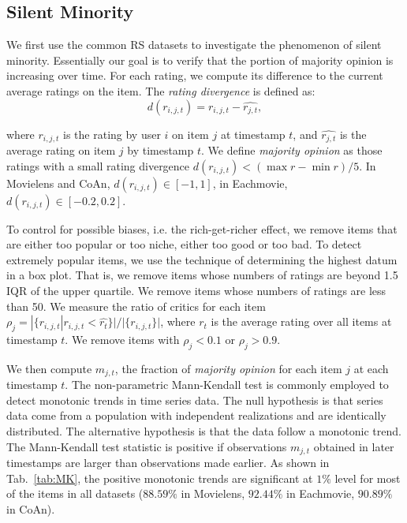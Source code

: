 \documentclass[sigconf]{acmart}
\begin{document}
\subsection{Silent Minority}
We first use the common RS datasets to investigate the phenomenon of silent minority. Essentially our goal is to verify that the portion of majority opinion is increasing over time. For each rating, we compute its difference to the current average ratings on the item. The \emph{rating divergence} is defined as:
\begin{equation}\label{equ:d}
d(r_{i,j,t})=r_{i,j,t}-\hat{r_{j,t}},
\end{equation}

\noindent where $r_{i,j,t}$ is the rating by user $i$ on item $j$ at timestamp $t$, and $\hat{r_{j,t}}$ is the average rating on item $j$ by timestamp $t$. We define \emph{majority opinion} as those ratings with a small rating divergence $d(r_{i,j,t})<(\max{r}-\min{r})/5$. In Movielens and CoAn, $d(r_{i,j,t})\in[-1,1]$, in Eachmovie,  $d(r_{i,j,t})\in[-0.2,0.2]$.

To control for possible biases, i.e. the rich-get-richer effect, we remove items that are either too popular or too niche, either too good or too bad. To detect extremely popular items, we use the technique of determining the highest datum in a box plot. That is, we remove items whose numbers of ratings are beyond 1.5 IQR of the upper quartile. We remove items whose numbers of ratings are less than 50. We measure the ratio of critics for each item $\rho_j=|\{r_{i,j,t}|r_{i,j,t}<\hat{r_t}\}|/|\{r_{i,j,t}\}|$, where $r_t$ is the average rating over all items at timestamp $t$. We remove items with $\rho_j<0.1$ or $\rho_j>0.9$.

We then compute $m_{j,t}$, the fraction of \emph{majority opinion} for each item $j$ at each timestamp $t$. The non-parametric Mann-Kendall test is commonly employed to detect monotonic trends in time series data. The null hypothesis is that series data come from a population with independent realizations and are identically distributed. The alternative hypothesis is that the data follow a monotonic trend. The Mann-Kendall test statistic is positive if observations $m_{j,t}$ obtained in later timestamps are larger than observations made earlier. As shown in Tab.~\ref{tab:MK}, the positive monotonic trends are significant at $1\%$ level for most of the items in all datasets ($88.59\%$ in Movielens, $92.44\%$ in Eachmovie, $90.89\%$ in CoAn).  
\end{document}

